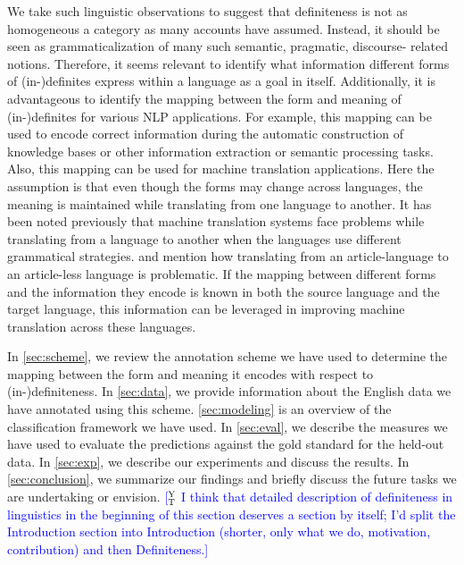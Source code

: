 \documentclass[11pt,letterpaper]{article}
\newcommand{\ensuretext}[1]{#1}
\newcommand{\nssmarker}{\ensuretext{\textcolor{magenta}{\ensuremath{^{\textsc{NS}}_{\textsc{S}}}}}}
\newcommand{\abmarker}{\ensuretext{\textcolor{red}{\ensuremath{^{\textsc{A}}_{\textsc{B}}}}}}
\newcommand{\ytmarker}{\ensuretext{\textcolor{blue}{\ensuremath{^{\textsc{Y}}_{\textsc{T}}}}}}
\newcommand{\arkcomment}[3]{\ensuretext{\textcolor{#3}{[#1 #2]}}}
\newcommand{\nss}[1]{\arkcomment{\nssmarker}{#1}{magenta}}
\newcommand{\ab}[1]{\arkcomment{\abmarker}{#1}{red}}
\newcommand{\yt}[1]{\arkcomment{\ytmarker}{#1}{blue}}
\begin{document}
We take such linguistic observations to suggest that definiteness is not as homogeneous a category as many accounts have assumed. Instead, it should be seen as grammaticalization of many such semantic, pragmatic, discourse- related notions. Therefore, it seems relevant to identify what information different forms of (in-)definites express within a language as a goal in itself. Additionally, it is advantageous to identify the mapping between the form and meaning of (in-)definites for various NLP applications. For example, this mapping can be used to encode correct information during the automatic construction of knowledge bases or other information extraction or semantic processing tasks. Also, this mapping can be used for machine translation applications. Here the assumption is that even though the forms may change across languages, the meaning is maintained while translating from one language to another. It has been noted previously that machine translation systems face problems while translating from a language to another when the languages use different grammatical strategies. \cite{tsvetkov13} and \cite{stymne09} mention how translating from an article-language to an article-less language is problematic. If the mapping between different forms and the information they encode is known in both the source language and the target language, this information can be leveraged in improving machine translation across these languages.  

In \cref{sec:scheme}, we review the annotation scheme we have used to determine the mapping between the form and meaning it encodes with respect to (in-)definiteness. In \cref{sec:data}, we provide information about the English data we have annotated using this scheme. \cref{sec:modeling} is an overview of the classification framework we have used. In \cref{sec:eval}, we describe the measures we have used to evaluate the predictions against the gold standard for the held-out data. In \cref{sec:exp}, we describe our experiments and discuss the results. In \cref{sec:conclusion}, we summarize our findings and briefly discuss the future tasks we are undertaking or envision.    \yt{I think that detailed description of definiteness in linguistics in the beginning of this section deserves a section by itself; I'd split the Introduction section into Introduction (shorter, only what we do, motivation, contribution) and then Definiteness.} 

\end{document}
